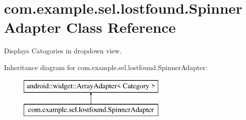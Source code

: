 \hypertarget{classcom_1_1example_1_1sel_1_1lostfound_1_1SpinnerAdapter}{}\section{com.\+example.\+sel.\+lostfound.\+Spinner\+Adapter Class Reference}
\label{classcom_1_1example_1_1sel_1_1lostfound_1_1SpinnerAdapter}


Displays Catogories in dropdown view.  


Inheritance diagram for com.\+example.\+sel.\+lostfound.\+Spinner\+Adapter\+:\begin{figure}[H]
\begin{center}
\leavevmode
\includegraphics[height=2.000000cm]{classcom_1_1example_1_1sel_1_1lostfound_1_1SpinnerAdapter}
\end{center}
\end{figure}
